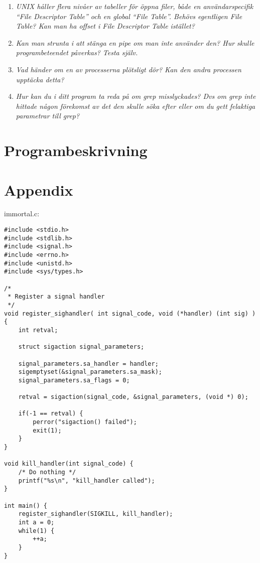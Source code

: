 \documentclass[paper=a4, fontsize=11pt]{scrartcl} %
\numberwithin{equation}{section} %
\numberwithin{figure}{section} %
\numberwithin{table}{section} %
\begin{document}
\begin{enumerate}[1)]
\item \emph{UNIX håller flera nivåer av tabeller för öppna filer, både en användarspecifik “File Descriptor Table” och en global “File Table”. Behövs egentligen File Table? Kan man ha offset i File Descriptor Table istället?}


\item \emph{Kan man strunta i att stänga en pipe om man inte använder den? Hur skulle programbeteendet påverkas? Testa själv.}


\item \emph{Vad händer om en av processerna plötsligt dör? Kan den andra processen upptäcka detta?}


\item \emph{Hur kan du i ditt program ta reda på om grep misslyckades? Dvs om grep inte hittade någon förekomst av det den skulle söka efter eller om du gett felaktiga parametrar till grep?}

\end{enumerate}

\section{Programbeskrivning}

\newpage
\section*{Appendix}
immortal.c:\\

\begin{verbatim}
#include <stdio.h>
#include <stdlib.h>
#include <signal.h>
#include <errno.h>
#include <unistd.h>
#include <sys/types.h>

/*
 * Register a signal handler
 */
void register_sighandler( int signal_code, void (*handler) (int sig) )  {
    int retval;

    struct sigaction signal_parameters;

    signal_parameters.sa_handler = handler;
    sigemptyset(&signal_parameters.sa_mask);
    signal_parameters.sa_flags = 0;

    retval = sigaction(signal_code, &signal_parameters, (void *) 0);

    if(-1 == retval) {
        perror("sigaction() failed");
        exit(1);
    }
}

void kill_handler(int signal_code) {
    /* Do nothing */
    printf("%s\n", "kill_handler called");
}

int main() {
    register_sighandler(SIGKILL, kill_handler);
    int a = 0;
    while(1) {
        ++a;
    }
}
\end{verbatim}
\newpage


\end{document}

